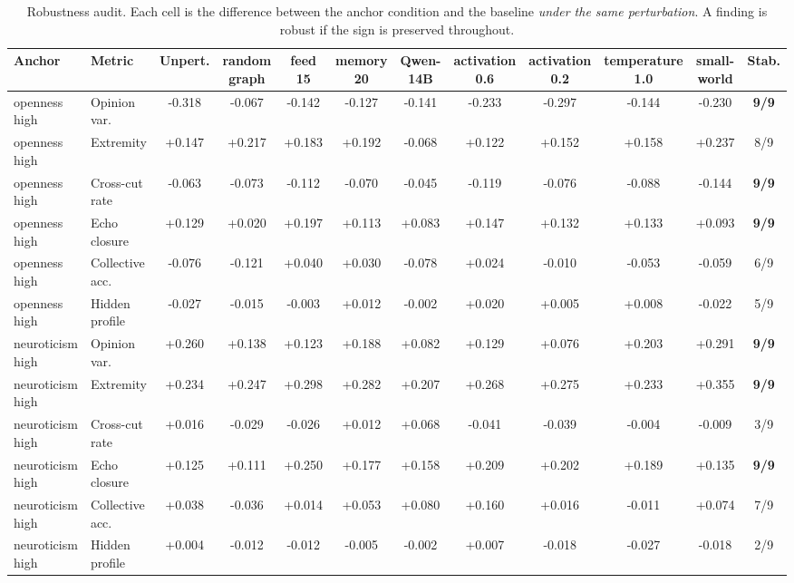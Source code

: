 \begin{table}[t]\centering
\small
\caption{Robustness audit. Each cell is the difference between the anchor condition and the baseline \emph{under the same perturbation}. A finding is robust if the sign is preserved throughout.}
\label{tab:e5audit}
\begin{tabular}{llcccccccccc}
\toprule
Anchor & Metric & Unpert. & random graph & feed 15 & memory 20 & Qwen-14B & activation 0.6 & activation 0.2 & temperature 1.0 & small-world & Stab. \\
\midrule
openness high & Opinion var. & -0.318 & -0.067 & -0.142 & -0.127 & -0.141 & -0.233 & -0.297 & -0.144 & -0.230 & \textbf{9/9} \\
openness high & Extremity & +0.147 & +0.217 & +0.183 & +0.192 & -0.068 & +0.122 & +0.152 & +0.158 & +0.237 & 8/9 \\
openness high & Cross-cut rate & -0.063 & -0.073 & -0.112 & -0.070 & -0.045 & -0.119 & -0.076 & -0.088 & -0.144 & \textbf{9/9} \\
openness high & Echo closure & +0.129 & +0.020 & +0.197 & +0.113 & +0.083 & +0.147 & +0.132 & +0.133 & +0.093 & \textbf{9/9} \\
openness high & Collective acc. & -0.076 & -0.121 & +0.040 & +0.030 & -0.078 & +0.024 & -0.010 & -0.053 & -0.059 & 6/9 \\
openness high & Hidden profile & -0.027 & -0.015 & -0.003 & +0.012 & -0.002 & +0.020 & +0.005 & +0.008 & -0.022 & 5/9 \\
neuroticism high & Opinion var. & +0.260 & +0.138 & +0.123 & +0.188 & +0.082 & +0.129 & +0.076 & +0.203 & +0.291 & \textbf{9/9} \\
neuroticism high & Extremity & +0.234 & +0.247 & +0.298 & +0.282 & +0.207 & +0.268 & +0.275 & +0.233 & +0.355 & \textbf{9/9} \\
neuroticism high & Cross-cut rate & +0.016 & -0.029 & -0.026 & +0.012 & +0.068 & -0.041 & -0.039 & -0.004 & -0.009 & 3/9 \\
neuroticism high & Echo closure & +0.125 & +0.111 & +0.250 & +0.177 & +0.158 & +0.209 & +0.202 & +0.189 & +0.135 & \textbf{9/9} \\
neuroticism high & Collective acc. & +0.038 & -0.036 & +0.014 & +0.053 & +0.080 & +0.160 & +0.016 & -0.011 & +0.074 & 7/9 \\
neuroticism high & Hidden profile & +0.004 & -0.012 & -0.012 & -0.005 & -0.002 & +0.007 & -0.018 & -0.027 & -0.018 & 2/9 \\
\bottomrule
\end{tabular}
\end{table}